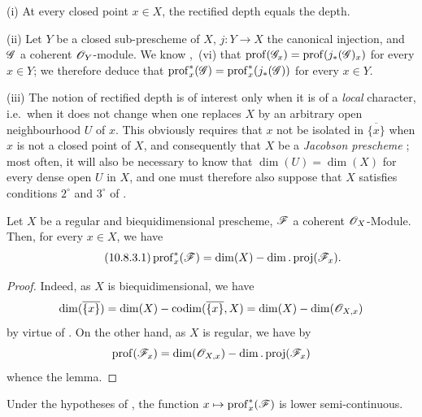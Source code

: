 \begin{remarks}[10.8.2]
\label{IV.10.8.2}
(i) At every closed point $x\in X$, the rectified depth equals the depth.

(ii) Let $Y$ be a closed sub-prescheme of $X$, $j:Y\to X$ the canonical injection, and $\mathscr{G}$ a coherent $\mathscr{O}_Y$-module.
We know ,~(vi) that $\operatorname{prof}(\mathscr{G}_x)=\operatorname{prof}(j_*(\mathscr{G})_x)$ for every $x\in Y$; we therefore deduce that $\operatorname{prof}^*_x(\mathscr{G})=\operatorname{prof}^*_x(j_*(\mathscr{G}))$ for every $x\in Y$.

(iii) The notion of rectified depth is of interest only when it is of a \emph{local} character, i.e.\ when it does not change when one replaces $X$ by an arbitrary open neighbourhood $U$ of $x$.
This obviously requires that $x$ not be isolated in $\overline{\{x\}}$ when $x$ is not a closed point of $X$, and consequently that $X$ be a \emph{Jacobson prescheme} ; most often, it will also be necessary to know that $\dim(U)=\dim(X)$ for every dense open $U$ in $X$, and one must therefore also suppose that $X$ satisfies conditions $2^\circ$ and $3^\circ$ of .
\end{remarks}

\begin{lemma}[10.8.3]
\label{IV.10.8.3}
Let $X$ be a regular and biequidimensional prescheme, $\mathscr{F}$ a coherent $\mathscr{O}_X$-Module.
Then, for every $x\in X$, we have
\begin{equation}
\label{IV.10.8.3.1}
\tag{10.8.3.1}
\operatorname{prof}^*_x(\mathscr{F})=\dim(X)-\dim.\operatorname{proj}(\mathscr{F}_x).
\end{equation}
\end{lemma}

\begin{proof}
Indeed, as $X$ is biequidimensional, we have 
\[
  \dim(\overline{\{x\}})=\dim(X)-\operatorname{codim}(\overline{\{x\}},X)=\dim(X)-\dim(\mathscr{O}_{X,x})
\]
by virtue of .
On the other hand, as $X$ is regular, we have by 
\[
  \operatorname{prof}(\mathscr{F}_x)=\dim(\mathscr{O}_{X,x})-\dim.\operatorname{proj}(\mathscr{F}_x)
\]
whence the lemma.
\end{proof}

\begin{corollary}[10.8.4]
\label{IV.10.8.4}
Under the hypotheses of , the function $x\mapsto\operatorname{prof}^*_x(\mathscr{F})$ is lower semi-continuous.
\end{corollary}

